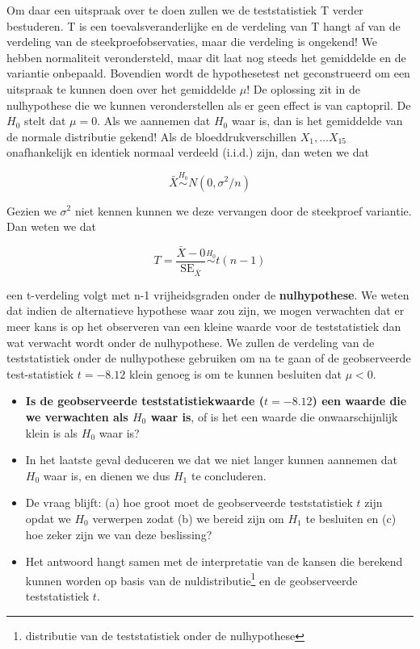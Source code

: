 \documentclass[
  12pt,dutch,coursenotes]{book}
\providecommand{\tightlist}{%
  \setlength{\itemsep}{0pt}\setlength{\parskip}{0pt}}
\begin{document}
Om daar een uitspraak over te doen zullen we de teststatistiek T verder bestuderen.
T is een toevalsveranderlijke en de verdeling van T hangt af van de verdeling van de steekproefobservaties, maar die verdeling is ongekend!
We hebben normaliteit verondersteld, maar dit laat nog steeds het gemiddelde en de variantie onbepaald.
Bovendien wordt de hypothesetest net geconstrueerd om een uitspraak te kunnen doen over het gemiddelde \(\mu\)!
De oplossing zit in de nulhypothese die we kunnen veronderstellen als er geen effect is van captopril.
De \(H_0\) stelt dat \(\mu=0\).
Als we aannemen dat \(H_0\) waar is, dan is het gemiddelde van de normale distributie gekend!
Als de bloeddrukverschillen \(X_1, \ldots X_{15}\) onafhankelijk en identiek normaal verdeeld (i.i.d.) zijn, dan weten we dat

\[\bar X  \stackrel{H_0}{\sim} N(0, \sigma^2/n)\]

Gezien we \(\sigma^2\) niet kennen kunnen we deze vervangen door de steekproef variantie. Dan weten we dat

\[T=\frac{\bar{X}-0}{\text{SE}_{\bar X}}\stackrel{H_0}{\sim} t(n-1) \]

een t-verdeling volgt met n-1 vrijheidsgraden onder de \textbf{nulhypothese}.
We weten dat indien de alternatieve hypothese waar zou zijn, we mogen verwachten dat er meer kans is op het observeren van een kleine waarde voor de teststatistiek dan wat verwacht wordt onder de nulhypothese.
We zullen de verdeling van de teststatistiek onder de nulhypothese gebruiken om na te gaan of de geobserveerde test-statistiek \(t = -8.12\) klein genoeg is om te kunnen besluiten dat \(\mu < 0\).

\begin{itemize}
\tightlist
\item
  \textbf{Is de geobserveerde teststatistiekwaarde (\(t=-8.12\)) een waarde die we verwachten als \(H_0\) waar is}, of is het een waarde die onwaarschijnlijk klein is als \(H_0\) waar is?
\item
  In het laatste geval deduceren we dat we niet langer kunnen aannemen dat \(H_0\) waar is, en dienen we dus \(H_1\) te concluderen.
\item
  De vraag blijft: (a) hoe groot moet de geobserveerde teststatistiek \(t\) zijn opdat we \(H_0\) verwerpen zodat (b) we bereid zijn om \(H_1\) te besluiten en (c) hoe zeker zijn we van deze beslissing?
\item
  Het antwoord hangt samen met de interpretatie van de kansen die berekend kunnen worden op basis van de nuldistributie\footnote{distributie van de teststatistiek onder de nulhypothese} en de geobserveerde teststatistiek \(t\).
\end{itemize}
\end{document}
